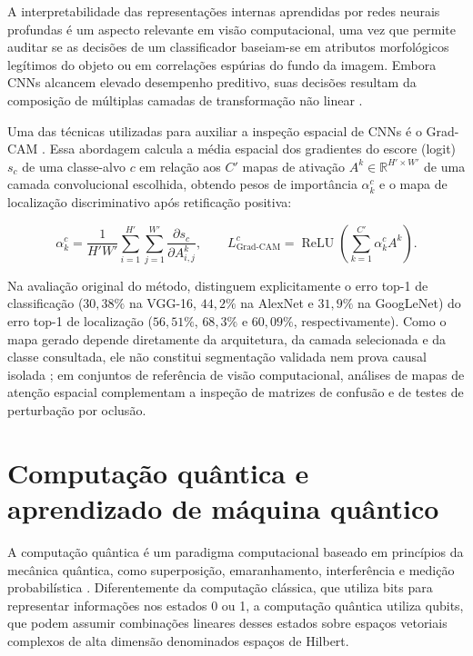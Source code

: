 \documentclass[
    12pt,
    openright,
    oneside,
    a4paper,
    english,
    brazil
]{abntex2}
\begin{document}
A interpretabilidade das representações internas aprendidas por redes neurais profundas é um aspecto relevante em visão computacional, uma vez que permite auditar se as decisões de um classificador baseiam-se em atributos morfológicos legítimos do objeto ou em correlações espúrias do fundo da imagem. Embora CNNs alcancem elevado desempenho preditivo, suas decisões resultam da composição de múltiplas camadas de transformação não linear \cite{selvaraju2020gradcam,adebayo2018sanity}.

Uma das técnicas utilizadas para auxiliar a inspeção espacial de CNNs é o Grad-CAM \cite{selvaraju2020gradcam}. Essa abordagem calcula a média espacial dos gradientes do escore (logit) \(s_c\) de uma classe-alvo \(c\) em relação aos \(C'\) mapas de ativação \(A^k \in \mathbb{R}^{H' \times W'}\) de uma camada convolucional escolhida, obtendo pesos de importância \(\alpha_k^c\) e o mapa de localização discriminativo após retificação positiva:

\begin{equation}
\label{eq:grad_cam}
\alpha_k^c =
\frac{1}{H' W'}
\sum_{i=1}^{H'}
\sum_{j=1}^{W'}
\frac{\partial s_c}{\partial A_{i,j}^k},
\qquad
L_{\text{Grad-CAM}}^c =
\operatorname{ReLU}\!\left(
\sum_{k=1}^{C'}
\alpha_k^c A^k
\right).
\end{equation}

Na avaliação original do método,  distinguem explicitamente o erro top-1 de classificação (\(30{,}38\%\) na VGG-16, \(44{,}2\%\) na AlexNet e \(31{,}9\%\) na GoogLeNet) do erro top-1 de localização (\(56{,}51\%\), \(68{,}3\%\) e \(60{,}09\%\), respectivamente). Como o mapa gerado depende diretamente da arquitetura, da camada selecionada e da classe consultada, ele não constitui segmentação validada nem prova causal isolada \cite{adebayo2018sanity}; em conjuntos de referência de visão computacional, análises de mapas de atenção espacial complementam a inspeção de matrizes de confusão e de testes de perturbação por oclusão.

\section{Computação quântica e aprendizado de máquina quântico}

A computação quântica é um paradigma computacional baseado em princípios da mecânica quântica, como superposição, emaranhamento, interferência e medição probabilística \cite{nielsen2010quantum}. Diferentemente da computação clássica, que utiliza bits para representar informações nos estados 0 ou 1, a computação quântica utiliza qubits, que podem assumir combinações lineares desses estados sobre espaços vetoriais complexos de alta dimensão denominados espaços de Hilbert.
\end{document}
